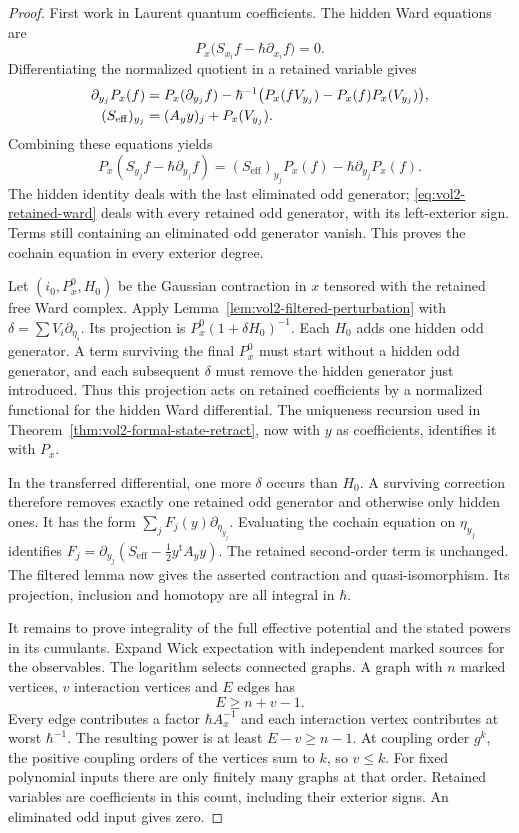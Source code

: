 \begin{proof}
First work in Laurent quantum coefficients. The hidden Ward
equations are
\[
 P_x\bigl(S_{x_i}f-\hbar\partial_{x_i}f\bigr)=0.
\]
Differentiating the normalized quotient in a retained variable
gives
\begin{align}
 \partial_{y_j}P_x(f)
 &=P_x(\partial_{y_j}f)
       -\hbar^{-1}\bigl(P_x(fV_{y_j})-P_x(f)P_x(V_{y_j})\bigr),
       \label{eq:vol2-retained-covariance}\\
 (S_{\mathrm{eff}})_{y_j}
 &=(A_yy)_j+P_x(V_{y_j}).\notag
\end{align}
Combining these equations yields
\begin{equation}\label{eq:vol2-retained-ward}
 P_x(S_{y_j}f-\hbar\partial_{y_j}f)
   =(S_{\mathrm{eff}})_{y_j}P_x(f)
                           -\hbar\partial_{y_j}P_x(f).
\end{equation}
The hidden identity deals with the last eliminated odd
generator; \eqref{eq:vol2-retained-ward} deals with every
retained odd generator, with its left-exterior sign.
Terms still containing an eliminated odd generator vanish.
This proves the cochain equation in every exterior degree.

Let $(i_0,P_x^0,H_0)$ be the Gaussian contraction in $x$
tensored with the retained free Ward complex. Apply
Lemma~\ref{lem:vol2-filtered-perturbation} with
$\delta=\sum V_i\partial_{\eta_i}$. Its projection is
$P_x^0(1+\delta H_0)^{-1}$. Each $H_0$ adds one hidden
odd generator. A term surviving the final $P_x^0$ must
start without a hidden odd generator, and each subsequent
$\delta$ must remove the hidden generator just introduced.
Thus this projection acts on retained coefficients by a
normalized functional for the hidden Ward differential.
The uniqueness recursion used in
Theorem~\ref{thm:vol2-formal-state-retract}, now with $y$
as coefficients, identifies it with $P_x$.

In the transferred differential, one more $\delta$ occurs
than $H_0$. A surviving correction therefore removes exactly
one retained odd generator and otherwise only hidden ones.
It has the form $\sum_jF_j(y)\partial_{\eta_{y_j}}$.
Evaluating the cochain equation on $\eta_{y_j}$ identifies
$F_j=\partial_{y_j}(S_{\mathrm{eff}}-\tfrac12y^{\mathrm t}A_yy)$.
The retained second-order term is unchanged. The filtered
lemma now gives the asserted contraction and quasi-isomorphism.
Its projection, inclusion and homotopy are all integral in
$\hbar$.

It remains to prove integrality of the full effective potential
and the stated powers in its cumulants. Expand Wick
expectation with independent marked sources for the observables.
The logarithm selects connected graphs. A graph with $n$
marked vertices, $v$ interaction vertices and $E$ edges has
\[
 E\geq n+v-1.
\]
Every edge contributes a factor $\hbar A_x^{-1}$ and each
interaction vertex contributes at worst $\hbar^{-1}$.
The resulting power is at least $E-v\geq n-1$.
At coupling order $g^k$, the positive coupling orders of
the vertices sum to $k$, so $v\leq k$. For fixed polynomial
inputs there are only finitely many graphs at that order.
Retained variables are coefficients in this count, including
their exterior signs. An eliminated odd input gives zero.


\end{proof}
